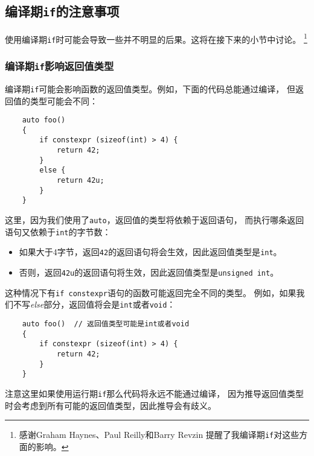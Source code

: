 \subsection{编译期\texttt{if}的注意事项}
使用编译期\texttt{if}时可能会导致一些并不明显的后果。这将在接下来的小节中讨论。
\footnote{感谢Graham Haynes、Paul Reilly和Barry Revzin
提醒了我编译期\texttt{if}对这些方面的影响。}

\subsubsection{编译期\texttt{if}影响返回值类型}
编译期\texttt{if}可能会影响函数的返回值类型。例如，下面的代码总能通过编译，
但返回值的类型可能会不同：
\begin{lstlisting}
    auto foo()
    {
        if constexpr (sizeof(int) > 4) {
            return 42;
        }
        else {
            return 42u;
        }
    }
\end{lstlisting}
这里，因为我们使用了\texttt{auto}，返回值的类型将依赖于返回语句，
而执行哪条返回语句又依赖于\texttt{int}的字节数：
\begin{itemize}
    \item 如果大于4字节，返回\texttt{42}的返回语句将会生效，因此返回值类型是\texttt{int}。
    \item 否则，返回\texttt{42u}的返回语句将生效，因此返回值类型是\texttt{unsigned int}。
\end{itemize}
这种情况下有\texttt{if constexpr}语句的函数可能返回完全不同的类型。
例如，如果我们不写\emph{else}部分，返回值将会是\texttt{int}或者\texttt{void}：
\begin{lstlisting}
    auto foo()  // 返回值类型可能是int或者void
    {
        if constexpr (sizeof(int) > 4) {
            return 42;
        }
    }
\end{lstlisting}
注意这里如果使用运行期\texttt{if}那么代码将永远不能通过编译，
因为推导返回值类型时会考虑到所有可能的返回值类型，因此推导会有歧义。

